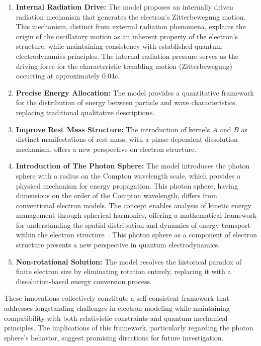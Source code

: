 \documentclass[%
 reprint,
 amsmath,amssymb,
 aps,
]{revtex4-1}
\numberwithin{equation}{section}%
\begin{document}
\begin{enumerate}

\item \textbf{Internal Radiation Drive:} The model proposes an internally driven radiation mechanism that generates the electron's Zitterbewegung motion. This mechanism, distinct from external radiation phenomena, explains the origin of the oscillatory motion as an inherent property of the electron's structure, while maintaining consistency with established quantum electrodynamics principles. The internal radiation pressure serves as the driving force for the characteristic trembling motion (Zitterbewegung) occurring at approximately $0.04c$.

\item \textbf{Precise Energy Allocation:} The model provides a quantitative framework for the distribution of energy between particle and wave characteristics, replacing traditional qualitative descriptions.

\item \textbf{Improve Rest Mass Structure:} The introduction of kernels $A$ and $B$ as distinct manifestations of rest mass, with a phase-dependent dissolution mechanism, offers a new perspective on electron structure.

\item \textbf{Introduction of The Photon Sphere:} The model introduces the photon sphere with a radius on the Compton wavelength scale, which provides a physical mechanism for energy propagation. This photon sphere, having dimensions on the order of the Compton wavelength, differs from conventional electron models. The concept enables analysis of kinetic energy management through spherical harmonics, offering a mathematical framework for understanding the spatial distribution and dynamics of energy transport within the electron structure~\cite{Arfken2012}. This photon sphere as a component of electron structure presents a new perspective in quantum electrodynamics.

\item \textbf{Non-rotational Solution:} The model resolves the historical paradox of finite electron size by eliminating rotation entirely, replacing it with a dissolution-based energy conversion process.

\end{enumerate}

These innovations collectively constitute a self-consistent framework that addresses longstanding challenges in electron modeling while maintaining compatibility with both relativistic constraints and quantum mechanical principles. The implications of this framework, particularly regarding the photon sphere's behavior, suggest promising directions for future investigation.
\end{document}
